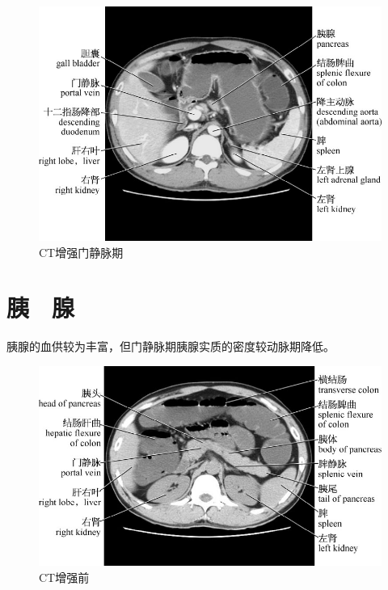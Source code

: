 \begin{figure}[!htbp]
 \centering
 \includegraphics{./images/Image00145.jpg}
 \captionsetup{justification=centering}
 \caption{CT增强门静脉期}
  \end{figure} 
 \FloatBarrier

\section{胰　腺}

胰腺的血供较为丰富，但门静脉期胰腺实质的密度较动脉期降低。

\begin{figure}[!htbp]
 \centering
 \includegraphics{./images/Image00146.jpg}
 \captionsetup{justification=centering}
 \caption{CT增强前}
  \end{figure} 
 \FloatBarrier

